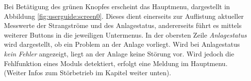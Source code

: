 Bei Bet\"atigung des gr\"unen Knopfes  erscheint das Hauptmenu, dargestellt in
Abbildung \ref{fig:userguide:screen0}. Dieses dient  einerseits zur Auflistung
aktueller  Messwerte der  Strangstr\"ome  und  des Anlagestatus,  andererseits
f\"uhrt  es mittels  weiterer  Buttons in  die  jeweiligen Untermenus. In  der
obersten Zeile  \emph{Anlagestatus} wird  dargestellt, ob  ein Problem  an der
Anlage vorliegt. Wird bei Anlagestatus  \emph{kein Fehler} angezeigt, liegt an
der  Anlage keine  St\"orung vor. Wird  jedoch die  Fehlfunktion eines  Moduls
detektiert, erfolgt eine Meldung im Hauptmenu. (Weiter Infos zum St\"orbetrieb
im Kapitel weiter unten).

\vspace*{3em}
\noindent{}
\noindent{}

